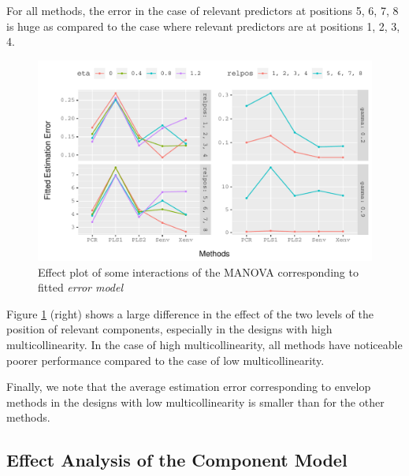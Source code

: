 \documentclass[12pt,3p,authoryear]{elsarticle}
\begin{document}
For all methods, the error in the case of relevant predictors at
positions 5, 6, 7, 8 is huge as compared to the case where relevant
predictors are at positions 1, 2, 3, 4.




\begin{figure}
\includegraphics[width=1\linewidth]{Images/pdf/est-eff-plots-1} \caption{Effect plot of some interactions of the MANOVA
corresponding to fitted \emph{error model}}\label{fig:est-eff-plots}
\end{figure}

Figure \ref{fig:est-eff-plots} (right) shows a large difference in the
effect of the two levels of the position of relevant components,
especially in the designs with high multicollinearity. In the case of
high multicollinearity, all methods have noticeable poorer performance
compared to the case of low multicollinearity.

Finally, we note that the average estimation error corresponding to
envelop methods in the designs with low multicollinearity is smaller
than for the other methods.

\subsection{Effect Analysis of the Component
Model}\label{effect-analysis-of-the-component-model}
\end{document}
